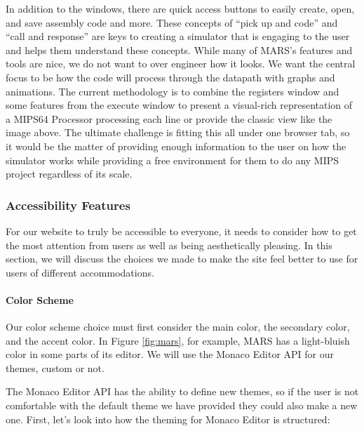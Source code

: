 \documentclass[
    paper=letter,
    parskip=half,
    fontsize=12pt,
    titlepage=firstiscover,
    toc=bibliography,
    numbers=endperiod
]{scrartcl}
\begin{document}
In addition to the windows, there are quick access buttons to easily
create, open, and save assembly code and more. These concepts of ``pick
up and code'' and ``call and response'' are keys to creating a simulator
that is engaging to the user and helps them understand these concepts.
While many of MARS's features and tools are nice, we do not want to over
engineer how it looks. We want the central focus to be how the code
will process through the datapath with graphs and animations. The
current methodology is to combine the registers window and some features
from the execute window to present a visual-rich representation of a
MIPS64 Processor processing each line or provide the classic view like
the image above. The ultimate challenge is fitting this all under one
browser tab, so it would be the matter of providing enough information
to the user on how the simulator works while providing a free
environment for them to do any MIPS project regardless of its scale.

\subsubsection{Accessibility Features}
\label{subsec:accessibility-features}

For our website to truly be accessible to everyone, it needs to consider
how to get the most attention from users as well as being aesthetically
pleasing. In this section, we will discuss the choices we made to make
the site feel better to use for users of different accommodations.

\paragraph{Color Scheme}

Our color scheme choice must first consider the main color, the
secondary color, and the accent color. In Figure \ref{fig:mars}, for example, MARS
has a light-bluish color in some parts of its editor. We will use the
Monaco Editor API for our themes, custom or not.

The Monaco Editor API has the ability to define new themes, so if the
user is not comfortable with the default theme we have provided they
could also make a new one. First, let's look into how the theming for
Monaco Editor is structured:
\end{document}
